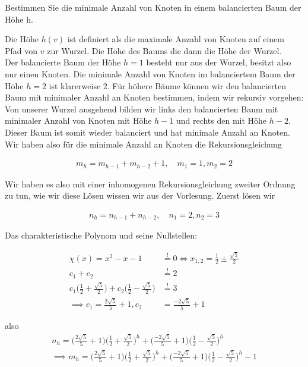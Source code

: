 
\begin{exercise}

Bestimmen Sie die minimale Anzahl von Knoten in einem balancierten Baum der Höhe h.

\end{exercise}


\begin{solution}
Die Höhe $h(v)$ ist definiert als die maximale Anzahl von Knoten auf einem Pfad von $v$
zur Wurzel. Die Höhe des Baums die dann die Höhe der Wurzel. \\
Der balancierte Baum der Höhe $h = 1$ besteht nur aus der Wurzel, besitzt also nur einen Knoten.
Die minimale Anzahl von Knoten im balanciertem Baum der Höhe $h = 2$ ist klarerweise $2$.
Für höhere Bäume können wir den balancierten Baum mit minimaler Anzahl an Knoten bestimmen,
indem wir rekursiv vorgehen: Von unserer Wurzel ausgehend bilden wir links den
balancierten Baum mit minimaler Anzahl von Knoten mit Höhe $h-1$ und rechts den mit Höhe $h-2$.
Dieser Baum ist somit wieder balanciert und hat minimale Anzahl an Knoten.
Wir haben also für die minimale Anzahl an Knoten die Rekursionsgleichung

\begin{align*}
  m_h = m_{h-1} + m_{h-2} + 1, \quad m_1 = 1, m_2 = 2
\end{align*}

Wir haben es also mit einer inhomogenen Rekursionsgleichung zweiter Ordnung zu tun, wie wir diese Lösen wissen wir aus der Vorlesung. Zuerst lösen wir

\begin{align*}
  n_h = n_{h-1} + n_{h-2}, \quad n_1 = 2, n_2 = 3
\end{align*}

Das charakteristische Polynom und seine Nullstellen:

\begin{align*}
  \chi(x) = x^2 - x - 1 &\stackrel{!}{=} 0
  \iff
  x_{1,2} = \frac{1}{2} \pm \frac{\sqrt{5}}{2} \\
  c_1 + c_2 &\stackrel{!}{=} 2 \\
  c_1\Big(\frac{1}{2} + \frac{\sqrt{5}}{2}\Big) + c_2 \Big(\frac{1}{2} - \frac{\sqrt{5}}{2}\Big) &\stackrel{!}{=} 3 \\
  \implies c_1 = \frac{2\sqrt{5}}{5} + 1, c_2 &= \frac{-2\sqrt{5}}{5} + 1
\end{align*}

also
\begin{align*}
  n_h = \Big(\frac{2\sqrt{5}}{5} + 1\Big)\Big(\frac{1}{2} + \frac{\sqrt{5}}{2}\Big)^h + \Big(\frac{-2\sqrt{5}}{5} + 1 \Big)\Big(\frac{1}{2} - \frac{\sqrt{5}}{2}\Big)^h \\
  \implies
  m_h = \Big(\frac{2\sqrt{5}}{5} + 1\Big)\Big(\frac{1}{2} + \frac{\sqrt{5}}{2}\Big)^h + \Big(\frac{-2\sqrt{5}}{5} + 1 \Big)\Big(\frac{1}{2} - \frac{\sqrt{5}}{2}\Big)^h - 1
\end{align*}
\end{solution}

